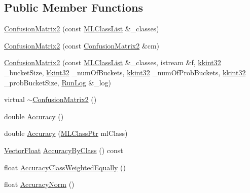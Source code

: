 \subsection*{Public Member Functions}
\begin{DoxyCompactItemize}
\item 
\hyperlink{class_k_k_m_l_l_1_1_confusion_matrix2_a856d67b4070de16eaa453b4f9c6b9cfa}{Confusion\+Matrix2} (const \hyperlink{class_k_k_m_l_l_1_1_m_l_class_list}{M\+L\+Class\+List} \&\+\_\+classes)
\item 
\hyperlink{class_k_k_m_l_l_1_1_confusion_matrix2_ac60d3f825f9649d5ca9f1db1f0bfaacd}{Confusion\+Matrix2} (const \hyperlink{class_k_k_m_l_l_1_1_confusion_matrix2}{Confusion\+Matrix2} \&cm)
\item 
\hyperlink{class_k_k_m_l_l_1_1_confusion_matrix2_a0929dcf5a2e1e174917aea8eedb64fa7}{Confusion\+Matrix2} (const \hyperlink{class_k_k_m_l_l_1_1_m_l_class_list}{M\+L\+Class\+List} \&\+\_\+classes, istream \&f, \hyperlink{namespace_k_k_b_a8fa4952cc84fda1de4bec1fbdd8d5b1b}{kkint32} \+\_\+bucket\+Size, \hyperlink{namespace_k_k_b_a8fa4952cc84fda1de4bec1fbdd8d5b1b}{kkint32} \+\_\+num\+Of\+Buckets, \hyperlink{namespace_k_k_b_a8fa4952cc84fda1de4bec1fbdd8d5b1b}{kkint32} \+\_\+num\+Of\+Prob\+Buckets, \hyperlink{namespace_k_k_b_a8fa4952cc84fda1de4bec1fbdd8d5b1b}{kkint32} \+\_\+prob\+Bucket\+Size, \hyperlink{class_k_k_b_1_1_run_log}{Run\+Log} \&\+\_\+log)
\item 
virtual \hyperlink{class_k_k_m_l_l_1_1_confusion_matrix2_aecdea51d2f462833f6958f867ca328f5}{$\sim$\+Confusion\+Matrix2} ()
\item 
double \hyperlink{class_k_k_m_l_l_1_1_confusion_matrix2_ab1c460627788135c3c15227115226733}{Accuracy} ()
\item 
double \hyperlink{class_k_k_m_l_l_1_1_confusion_matrix2_a63b5831c167105766a9049b3f6e0a89a}{Accuracy} (\hyperlink{namespace_k_k_m_l_l_ac272393853d59e72e8456f14cd6d8c23}{M\+L\+Class\+Ptr} ml\+Class)
\item 
\hyperlink{namespace_k_k_b_a4820c3670ee1fe74f0c4de981c600faf}{Vector\+Float} \hyperlink{class_k_k_m_l_l_1_1_confusion_matrix2_a6c56961e4b2c3726f063d04f267489da}{Accuracy\+By\+Class} () const 
\item 
float \hyperlink{class_k_k_m_l_l_1_1_confusion_matrix2_ae1c01183e47d34242a7f16e16eb7e2f4}{Accuracy\+Class\+Weighted\+Equally} ()
\item 
float \hyperlink{class_k_k_m_l_l_1_1_confusion_matrix2_a1bc4b4d27de9bde960f88c4f705e47a8}{Accuracy\+Norm} ()
\item 

\end{DoxyCompactItemize}
